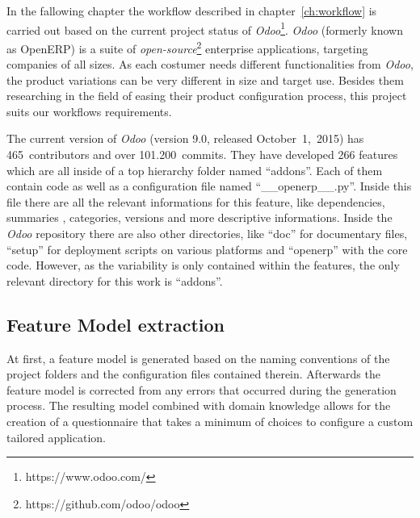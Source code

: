 In the fallowing chapter the workflow described in chapter~\ref{ch:workflow} is carried out based on the current project status of \textit{Odoo}\footnote{https://www.odoo.com/}. \textit{Odoo} (formerly known as OpenERP) is a suite of \textit{open-source}\footnote{https://github.com/odoo/odoo} enterprise applications, targeting companies of all sizes. As each costumer needs different functionalities from \textit{Odoo}, the product variations can be very different in size and target use. Besides them researching in the field of easing their product configuration process, this project suits our workflows requirements.

The current version of \textit{Odoo} (version 9.0, released \mbox{October 1, 2015)} has 465~contributors and over 101.200~commits. They have developed 266 features which are all inside of a top hierarchy folder named ``addons''. Each of them contain code as well as a configuration file named ``\_\_openerp\_\_.py''. Inside this file there are all the relevant informations for this feature, like dependencies, summaries , categories, versions and more descriptive informations. Inside the \textit{Odoo} repository there are also other directories, like ``doc'' for documentary files, ``setup'' for deployment scripts on various platforms and ``openerp'' with the core code. However, as the variability is only contained within the features, the only relevant directory for this work is ``addons''.

\subsection{Feature Model extraction}

At first, a feature model is generated based on the naming conventions of the project folders and the configuration files contained therein. Afterwards the feature model is corrected from any errors that occurred during the generation process. The resulting model combined with domain knowledge allows for the creation of a questionnaire that takes a minimum of choices to configure a custom tailored application.

